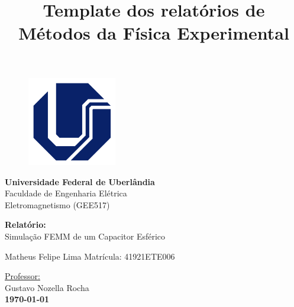 \documentclass[a4paper]{article}
\begin{document}
	\title{Template dos relatórios de Métodos da Física Experimental}
	
	
	\begin{titlepage}
		\begin{center}
			\begin{figure}[htb!]
				\begin{flushleft}
					\includegraphics[width=3.9cm]{latex/1024px-Ufu_logo.svg (2)}
				\end{flushleft}
			\end{figure}
			\vspace{-3,5cm}
			\begin{flushright}
				\Large{\textbf{Universidade Federal de Uberlândia}}\\
			\Large{Faculdade de Engenharia Elétrica}\\
			\Large{Eletromagnetismo (GEE517)}\\
			\end{flushright}
			
			\vspace{200pt}
			
			\LARGE{\textbf{Relatório:}}\\ 
			\Large{Simulação FEMM de um Capacitor Esférico}\\
			
			\vspace{150pt}
			
			
			\vspace{40pt} 
			\hfill Matheus Felipe Lima\hspace{20pt} Matrícula: 41921ETE006
			
			\vspace{25pt}
			\hfill \underline{Professor:}\\
			\hfill Gustavo Nozella Rocha\\
			
			
			\vspace{\fill}
			\LARGE \bf{\today}
			
		\end{center}
	\end{titlepage}
	
	
	\newpage
	
\end{document}
